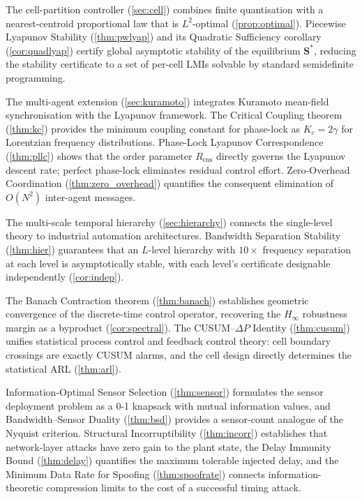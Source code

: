 \documentclass[10pt,twocolumn]{article}
\theoremstyle{plain}
\theoremstyle{definition}
\theoremstyle{remark}
\newcommand{\DeltaP}{\Delta P}
\newcommand{\Sstar}{\mathbf{S}^{*}}
\newcommand{\Rens}{R_{\mathrm{ens}}}
\begin{document}
The cell-partition controller (\cref{sec:cell}) combines finite
quantisation with a nearest-centroid proportional law that is $L^2$-optimal
(\cref{prop:optimal}).  Piecewise Lyapunov Stability (\cref{thm:pwlyap})
and its Quadratic Sufficiency corollary (\cref{cor:quadlyap}) certify
global asymptotic stability of the equilibrium $\Sstar$, reducing the
stability certificate to a set of per-cell LMIs solvable by standard
semidefinite programming.

The multi-agent extension (\cref{sec:kuramoto}) integrates Kuramoto
mean-field synchronisation with the Lyapunov framework.  The Critical
Coupling theorem (\cref{thm:kc}) provides the minimum coupling constant
for phase-lock as $K_c = 2\gamma$ for Lorentzian frequency
distributions.  Phase-Lock Lyapunov Correspondence (\cref{thm:pllc})
shows that the order parameter $\Rens$ directly governs the Lyapunov
descent rate; perfect phase-lock eliminates residual control effort.
Zero-Overhead Coordination (\cref{thm:zero_overhead}) quantifies the
consequent elimination of $O(N^2)$ inter-agent messages.

The multi-scale temporal hierarchy (\cref{sec:hierarchy}) connects the
single-level theory to industrial automation architectures.  Bandwidth
Separation Stability (\cref{thm:hier}) guarantees that an $L$-level
hierarchy with $10\times$ frequency separation at each level is
asymptotically stable, with each level's certificate designable
independently (\cref{cor:indep}).

The Banach Contraction theorem (\cref{thm:banach}) establishes geometric
convergence of the discrete-time control operator, recovering the
$H_\infty$ robustness margin as a byproduct (\cref{cor:spectral}).
The CUSUM--$\DeltaP$ Identity (\cref{thm:cusum}) unifies statistical
process control and feedback control theory: cell boundary crossings
are exactly CUSUM alarms, and the cell design directly determines
the statistical ARL (\cref{thm:arl}).

Information-Optimal Sensor Selection (\cref{thm:sensor}) formulates
the sensor deployment problem as a 0-1 knapsack with mutual information
values, and Bandwidth--Sensor Duality (\cref{thm:bsd}) provides a
sensor-count analogue of the Nyquist criterion.  Structural
Incorruptibility (\cref{thm:incorr}) establishes that network-layer
attacks have zero gain to the plant state, the Delay Immunity Bound
(\cref{thm:delay}) quantifies the maximum tolerable injected delay,
and the Minimum Data Rate for Spoofing (\cref{thm:spoofrate}) connects
information-theoretic compression limits to the cost of a successful
timing attack.
\end{document}
